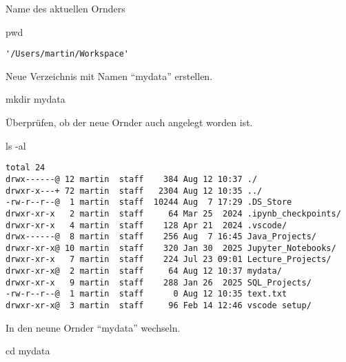 \documentclass[
  11pt,
  a4paper,
  DIV=11,
  numbers=noendperiod]{scrartcl}
\newenvironment{Shaded}{\begin{snugshade}}{\end{snugshade}}
\newcommand{\NormalTok}[1]{\textcolor[rgb]{0.00,0.23,0.31}{#1}}
\newcommand{\OperatorTok}[1]{\textcolor[rgb]{0.37,0.37,0.37}{#1}}
\begin{document}
Name des aktuellen Ornders

\begin{Shaded}
\begin{Highlighting}[numbers=left,,]
\NormalTok{pwd}
\end{Highlighting}
\end{Shaded}

\begin{verbatim}
'/Users/martin/Workspace'
\end{verbatim}

Neue Verzeichnis mit Namen ``mydata'' erstellen.

\begin{Shaded}
\begin{Highlighting}[numbers=left,,]
\NormalTok{mkdir mydata}
\end{Highlighting}
\end{Shaded}

Überprüfen, ob der neue Ornder auch angelegt worden ist.

\begin{Shaded}
\begin{Highlighting}[numbers=left,,]
\NormalTok{ls }\OperatorTok{{-}}\NormalTok{al}
\end{Highlighting}
\end{Shaded}

\begin{verbatim}
total 24
drwx------@ 12 martin  staff    384 Aug 12 10:37 ./
drwxr-x---+ 72 martin  staff   2304 Aug 12 10:35 ../
-rw-r--r--@  1 martin  staff  10244 Aug  7 17:29 .DS_Store
drwxr-xr-x   2 martin  staff     64 Mar 25  2024 .ipynb_checkpoints/
drwxr-xr-x   4 martin  staff    128 Apr 21  2024 .vscode/
drwx------@  8 martin  staff    256 Aug  7 16:45 Java_Projects/
drwxr-xr-x@ 10 martin  staff    320 Jan 30  2025 Jupyter_Notebooks/
drwxr-xr-x   7 martin  staff    224 Jul 23 09:01 Lecture_Projects/
drwxr-xr-x@  2 martin  staff     64 Aug 12 10:37 mydata/
drwxr-xr-x   9 martin  staff    288 Jan 26  2025 SQL_Projects/
-rw-r--r--@  1 martin  staff      0 Aug 12 10:35 text.txt
drwxr-xr-x@  3 martin  staff     96 Feb 14 12:46 vscode setup/
\end{verbatim}

In den neune Ornder ``mydata'' wechseln.

\begin{Shaded}
\begin{Highlighting}[numbers=left,,]
\NormalTok{cd mydata}
\end{Highlighting}
\end{Shaded}
\end{document}

